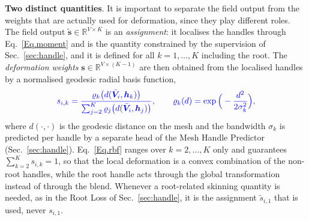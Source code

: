 \documentclass[lettersize,journal]{IEEEtran}
\newcommand{\blu}[1]{\texorpdfstring{{\leavevmode\color{blue}#1}}{#1}}
\begin{document}
\textbf{Two distinct quantities}. It is important to separate the field output from the
weights that are actually used for deformation, since they play different roles. The field
output $\tilde{\bm{s}} \in \mathbb{R}^{V \times K}$ is an \textit{assignment}: it localises
the handles through Eq.~\ref{Eq.moment} and is the quantity constrained by the supervision
of Sec.~\ref{sec:handle}, and it is defined for all $k=1,\dots,K$ including the root. The
\textit{deformation weights} $\bm{s} \in \mathbb{R}^{V \times (K-1)}$ are then obtained from
the localised handles by a normalised geodesic \blu{radial basis function,}
\begin{equation}\color{blue} \label{Eq.rbf}
s_{i,k}=
\frac{\varrho_{k}\big(d(\bar{\bm{V}}_{i},\bm{h}_{k})\big)}
{\sum_{j=2}^{K}\varrho_{j}\big(d(\bar{\bm{V}}_{i},\bm{h}_{j})\big)},
\qquad
\varrho_{k}(d)=
\exp\Big(-\frac{d^{2}}{2\sigma_{k}^{2}}\Big),
\end{equation}
where \blu{$d(\cdot,\cdot)$ is the geodesic distance on the} mesh \blu{and the bandwidth $\sigma_{k}$ is
predicted} per handle by a separate head of the Mesh Handle Predictor (Sec.~\ref{sec:handle}).
Eq.~\ref{Eq.rbf} ranges over $k=2,\dots,K$ only and guarantees
$\sum_{k=2}^{K}s_{i,k}=1$, so that the local deformation is a convex combination of the
non-root handles, while the root handle acts through the global transformation instead of
through the blend. Whenever a root-related skinning quantity is needed, as in the Root Loss
of Sec.~\ref{sec:handle}, it is the assignment $\tilde{s}_{i,1}$ that is used, never $s_{i,1}$.
\end{document}
